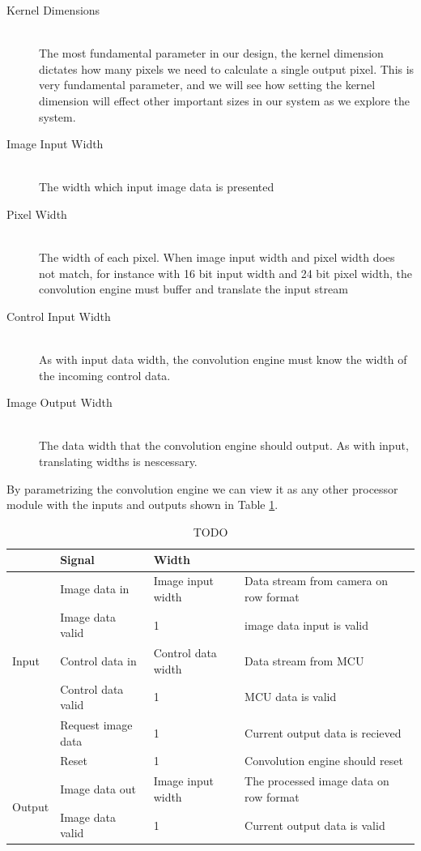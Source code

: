 \begin{description}
    \item[Kernel Dimensions] \hfill \\
        The most fundamental parameter in our design, the kernel dimension dictates how many pixels we need to calculate a single output pixel.
        This is very fundamental parameter, and we will see how setting the kernel dimension will effect other important sizes in our system as we explore the system.
    \item[Image Input Width] \hfill \\
        The width which input image data is presented 
    \item[Pixel Width] \hfill \\
        The width of each pixel. When image input width and pixel width does not match, for instance with 16 bit input width and 24 bit pixel width, the convolution engine must buffer and translate the input stream 
    \item[Control Input Width] \hfill \\
        As with input data width, the convolution engine must know the width of the incoming control data.
    \item[Image Output Width] \hfill \\
        The data width that the convolution engine should output. As with input, translating widths is nescessary.
\end{description}

By parametrizing the convolution engine we can view it as any other processor module with the inputs and outputs shown in Table \ref{tbl:ConvolutionEngineIO}.

\begin{table}[h]
    \begin{tabular}{l | l | l | l }
        &   Signal & Width\\
        \hline
        \multirow{5}{*}{Input}
        &   Image data in           & Image input width     & Data stream from camera on row format
        \\
        &   Image data valid        & 1                     & image data input is valid
        \\
        &   Control data in         & Control data width    & Data stream from MCU
        \\
        &   Control data valid      & 1                     & MCU data is valid
        \\
        &   Request image data      & 1                     & Current output data is recieved
        \\
        &   Reset                   & 1                     & Convolution engine should reset
        \\\hline
        \multirow{2}{*}{Output}
        &   Image data out          & Image input width     & The processed image data on row format\\
        &   Image data valid        & 1                     & Current output data is valid
    \end{tabular}
    \caption{TODO}
    \label{tbl:ConvolutionEngineIO}
\end{table}

